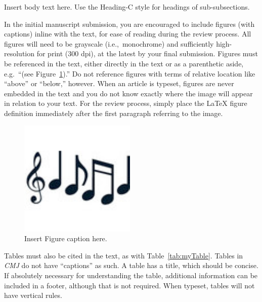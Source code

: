 \documentclass[letterpaper, 12pt]{article}
\begin{document}
Insert body text here.
Use the Heading-C style for headings of sub-subsections.

In the initial manuscript submission, you are encouraged to include figures (with captions) inline with the text, for ease of reading during the review process. 
All figures will need to be grayscale (i.e.,~monochrome) and sufficiently high-resolution for print (300 dpi), at the latest by your final submission.
Figures must be referenced in the text, either directly in the text or as a parenthetic aside, e.g.~``(see Figure~\ref{fig:myFigure}).''
Do not reference figures with terms of relative location like ``above'' or ``below,'' however.
When an article is typeset, figures are never embedded in the text and you do not know exactly where the image will appear in relation to your text.
For the review process, simply place the LaTeX figure definition immediately after the first paragraph referring to the image.

\begin{figure}[]
\begin{center}
\includegraphics{myFigure}
\caption{Insert Figure caption here.}
\label{fig:myFigure}
\end{center}
\end{figure}

Tables must also be cited in the text, as with Table~\ref{tab:myTable}. Tables in \emph{CMJ} do not have ``captions'' as such. A table has a title, which should be concise. If absolutely necessary for understanding the table, additional information can be included in a footer, although that is not required. When typeset, tables will not have vertical rules.
\end{document}
